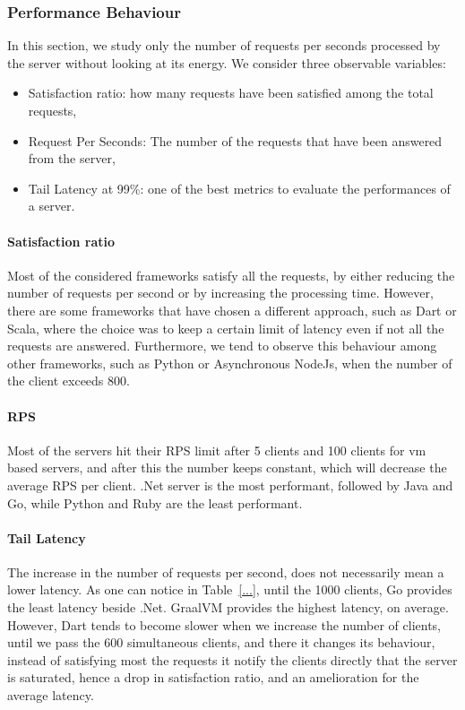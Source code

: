 \subsubsection{Performance Behaviour}
In this section, we study only the number of requests per seconds processed by the server without looking at its energy.
We consider three observable variables:
\begin{itemize}
    \item \textsf{Satisfaction ratio}: how many requests have been satisfied among the total requests,
    \item \textsf{Request Per Seconds}: The number of the requests that have been answered from the server,
    \item \textsf{Tail Latency at 99\%}: one of the best metrics to evaluate the performances of a server.
\end{itemize}

\paragraph{Satisfaction ratio}
Most of the considered frameworks satisfy all the requests, by either reducing the number of requests per second or by increasing the processing time.
However, there are some frameworks that have chosen a different approach, such as Dart or Scala, where the choice was to keep a certain limit of latency even if not all the requests are answered.
Furthermore, we tend to observe this behaviour among other frameworks, such as Python or Asynchronous NodeJs, when the number of the client exceeds 800.

\paragraph{RPS}
Most of the servers hit their RPS limit after 5 clients and 100 clients for vm based servers, and after this the number keeps constant, which will decrease the average RPS per client.
.Net server is the most performant, followed by Java and Go, while Python and Ruby are the least performant.

\paragraph{Tail Latency}
The increase in the number of requests per second, does not necessarily mean a lower latency.
As one can notice in Table~\ref{...}, until the 1000 clients, Go provides the least latency beside .Net.
GraalVM provides the highest latency, on average.
However, Dart tends to become slower when we increase the number of clients, until we pass the 600 simultaneous clients, and there it changes its behaviour, instead of satisfying most the requests it notify the clients directly that the server is saturated, hence a drop in satisfaction ratio, and an amelioration for the average latency.


